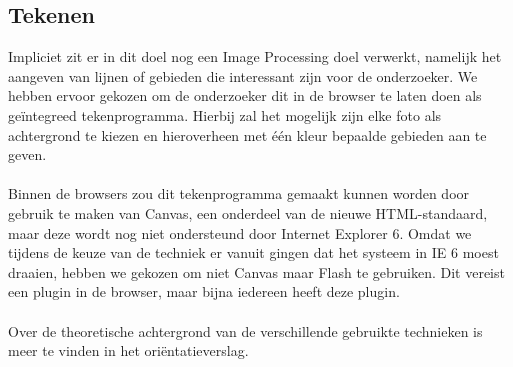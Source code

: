 \subsection{Tekenen}
Impliciet zit er in dit doel nog een Image Processing doel verwerkt, namelijk het aangeven van lijnen of gebieden die interessant zijn voor de onderzoeker. We hebben ervoor gekozen om de onderzoeker dit in de browser te laten doen als ge\"{i}ntegreed tekenprogramma. Hierbij zal het mogelijk zijn elke foto als achtergrond te kiezen en hieroverheen met \'{e}\'{e}n kleur bepaalde gebieden aan te geven.
\\
\\
Binnen de browsers zou dit tekenprogramma gemaakt kunnen worden door gebruik te maken van Canvas, een onderdeel van de nieuwe HTML-standaard, maar deze wordt nog niet ondersteund door Internet Explorer 6. Omdat we tijdens de keuze van de techniek er vanuit gingen dat het systeem in IE 6 moest draaien, hebben we gekozen om niet Canvas maar Flash te gebruiken. Dit vereist een plugin in de browser, maar bijna iedereen heeft deze plugin.
\\
\\
Over de theoretische achtergrond van de verschillende gebruikte technieken is meer te vinden in het ori\"{e}ntatieverslag.
